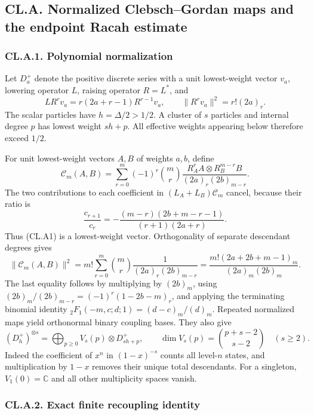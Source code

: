 \documentclass[a4paper,11pt]{article}
\numberwithin{equation}{section}
\begin{document}
\hypertarget{cl.a.-normalized-clebschgordan-maps-and-the-endpoint-racah-estimate}{%
\subsection{CL.A. Normalized Clebsch--Gordan maps and the endpoint Racah estimate}\label{cl.a.-normalized-clebschgordan-maps-and-the-endpoint-racah-estimate}}

\hypertarget{cl.a.1.-polynomial-normalization}{%
\subsubsection{CL.A.1. Polynomial normalization}\label{cl.a.1.-polynomial-normalization}}

Let \(D_a^+\) denote the positive discrete series with a unit lowest-weight vector \(v_a\), lowering operator \(L\), raising operator \(R=L^*\), and \[
LR^rv_a=r(2a+r-1)R^{r-1}v_a,\qquad
\|R^rv_a\|^2=r!(2a)_r.
\] The scalar particles have \(h=\Delta/2>1/2\). A cluster of \(s\) particles and internal degree \(p\) has lowest weight \(sh+p\). All effective weights appearing below therefore exceed \(1/2\).

For unit lowest-weight vectors \(A,B\) of weights \(a,b\), define \[
\mathcal C_m(A,B)=
\sum_{r=0}^m(-1)^r\binom mr
\frac{R_A^rA\otimes R_B^{m-r}B}{(2a)_r(2b)_{m-r}}.
\tag{CL.A1}
\] The two contributions to each coefficient in \((L_A+L_B)\mathcal C_m\) cancel, because their ratio is \[
\frac{c_{r+1}}{c_r}
=-\frac{(m-r)(2b+m-r-1)}{(r+1)(2a+r)}.
\] Thus (CL.A1) is a lowest-weight vector. Orthogonality of separate descendant degrees gives \[
\|\mathcal C_m(A,B)\|^2
=m!\sum_{r=0}^m\binom mr\frac1{(2a)_r(2b)_{m-r}}
=\frac{m!(2a+2b+m-1)_m}{(2a)_m(2b)_m}.
\tag{CL.A2}
\] The last equality follows by multiplying by \((2b)_m\), using \((2b)_m/(2b)_{m-r}=(-1)^r(1-2b-m)_r\), and applying the terminating binomial identity \({}_2F_1(-m,c;d;1)=(d-c)_m/(d)_m\). Repeated normalized maps yield orthonormal binary coupling bases. They also give \[
(D_h^+)^{\otimes s}
=\bigoplus_{p\geq0}V_s(p)\otimes D_{sh+p}^+,\qquad
\dim V_s(p)=\binom{p+s-2}{s-2}\quad(s\geq2).
\tag{CL.A3}
\] Indeed the coefficient of \(x^n\) in \((1-x)^{-s}\) counts all level-\(n\) states, and multiplication by \(1-x\) removes their unique total descendants. For a singleton, \(V_1(0)=\mathbb C\) and all other multiplicity spaces vanish.

\hypertarget{cl.a.2.-exact-finite-recoupling-identity}{%
\subsubsection{CL.A.2. Exact finite recoupling identity}\label{cl.a.2.-exact-finite-recoupling-identity}}
\end{document}
